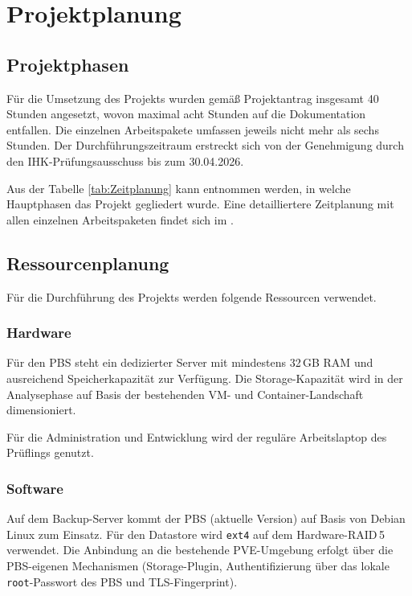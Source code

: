 \section{Projektplanung}
\label{sec:Projektplanung}


\subsection{Projektphasen}
\label{sec:Projektphasen}

Für die Umsetzung des Projekts wurden gemäß Projektantrag insgesamt 40
Stunden angesetzt, wovon maximal acht Stunden auf die Dokumentation
entfallen.
Die einzelnen Arbeitspakete umfassen jeweils nicht mehr als sechs
Stunden.
Der Durchführungszeitraum erstreckt sich von der Genehmigung durch den
IHK-Prüfungsausschuss bis zum 30.04.2026.

Aus der Tabelle \ref{tab:Zeitplanung} kann entnommen werden, in welche
Hauptphasen das Projekt gegliedert wurde.
Eine detailliertere Zeitplanung mit allen einzelnen Arbeitspaketen
findet sich im .



\subsection{Ressourcenplanung}
\label{sec:Ressourcenplanung}

Für die Durchführung des Projekts werden folgende Ressourcen verwendet.

\subsubsection{Hardware}
Für den \ac{PBS} steht ein dedizierter Server mit mindestens 32\,GB
\ac{RAM} und ausreichend Speicherkapazität zur Verfügung.
Die Storage-Kapazität wird in der Analysephase auf Basis der
bestehenden \ac{VM}- und Container-Landschaft dimensioniert.

Für die Administration und Entwicklung wird der reguläre
Arbeitslaptop des Prüflings genutzt.

\subsubsection{Software}
Auf dem Backup-Server kommt der \ac{PBS} (aktuelle Version) auf Basis von
Debian Linux zum Einsatz.
Für den Datastore wird \texttt{ext4} auf dem Hardware-\ac{RAID}\,5
verwendet.
Die Anbindung an die bestehende \ac{PVE}-Umgebung erfolgt über die
\ac{PBS}-eigenen Mechanismen (Storage-Plugin, Authentifizierung über
das lokale \texttt{root}-Passwort des \ac{PBS} und TLS-Fingerprint).

